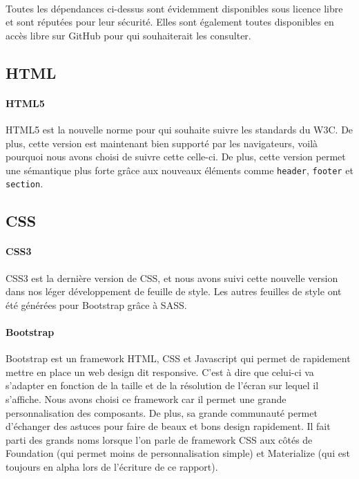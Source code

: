 \documentclass[12pt]{article}
\begin{document}
            \paragraph{} Toutes les dépendances ci-dessus sont évidemment disponibles sous licence libre et sont réputées pour leur sécurité. Elles sont également toutes disponibles en accès libre sur GitHub pour qui souhaiterait les consulter.

    \subsection{HTML}
        \paragraph{HTML5} HTML5 est la nouvelle norme pour qui souhaite suivre les standards du W3C. De plus, cette version est maintenant bien supporté par les navigateurs, voilà pourquoi nous avons choisi de suivre cette celle-ci. De plus, cette version permet une sémantique plus forte grâce aux nouveaux éléments comme \texttt{header}, \texttt{footer} et \texttt{section}.
        
    \subsection{CSS}
        \paragraph{CSS3} CSS3 est la dernière version de CSS, et nous avons suivi cette nouvelle version dans nos léger développement de feuille de style. Les autres feuilles de style ont été générées pour Bootstrap grâce à SASS.
        
        \paragraph{Bootstrap} Bootstrap est un framework HTML, CSS et Javascript qui permet de rapidement mettre en place un web design dit responsive. C'est à dire que celui-ci va s'adapter en fonction de la taille et de la résolution de l'écran sur lequel il s'affiche. Nous avons choisi ce framework car il permet une grande personnalisation des composants. De plus, sa grande communauté permet d'échanger des astuces pour faire de beaux et bons design rapidement. Il fait parti des grands noms lorsque l'on parle de framework CSS aux côtés de Foundation (qui permet moins de personnalisation simple) et Materialize (qui est toujours en alpha lors de l'écriture de ce rapport).
        
\end{document}

